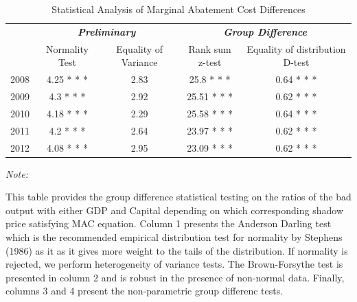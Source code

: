 \documentclass[
  12pt,
]{article}
\begin{document}
\begin{table}[H]

\caption{\label{tab:Test1}Statistical Analysis of Marginal Abatement Cost Differences}
\centering
\fontsize{10}{12}\selectfont
\begin{threeparttable}
\begin{tabular}[t]{lcccc}
\toprule
\multicolumn{1}{c}{\em{\textbf{}}} & \multicolumn{2}{c}{\em{\textbf{Preliminary}}} & \multicolumn{2}{c}{\em{\textbf{Group Difference }}} \\
\cmidrule(l{3pt}r{3pt}){2-3} \cmidrule(l{3pt}r{3pt}){4-5}
  & Normality Test & Equality of Variance & Rank sum z-test & Equality of distribution D-test\\
\midrule
2008 & 4.25 * * * & 2.83 & 25.8 * * * & 0.64 * * *\\
2009 & 4.3 * * * & 2.92 & 25.51 * * * & 0.62 * * *\\
2010 & 4.18 * * * & 2.29 & 25.58 * * * & 0.64 * * *\\
2011 & 4.2 * * * & 2.64 & 23.97 * * * & 0.62 * * *\\
2012 & 4.08 * * * & 2.95 & 23.09 * * * & 0.62 * * *\\
\bottomrule
\end{tabular}
\begin{tablenotes}
\item \textit{Note: } 
\item This table provides the group difference statistical testing on the ratios of the bad output with either GDP and Capital depending on which corresponding shadow price satisfying MAC equation. Column 1 presents the Anderson Darling test which is the recommended empirical distribution test for normality by Stephens (1986) as it as it gives more weight to the tails of the distribution.  If normality is rejected, we perform heterogeneity of variance tests. The Brown-Forsythe test is presented in column 2 and is robust in the presence of non-normal data. Finally, columns 3 and 4 present the non-parametric group differenc tests.
\end{tablenotes}
\end{threeparttable}
\end{table}
\end{document}
